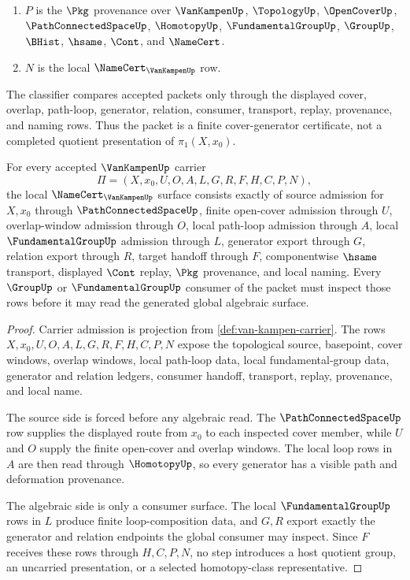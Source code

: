 \begin{definition}
\begin{enumerate}
\item $P$ is the $\Pkg$ provenance over $\VanKampenUp$, $\TopologyUp$, $\OpenCoverUp$, $\PathConnectedSpaceUp$, $\HomotopyUp$, $\FundamentalGroupUp$, $\GroupUp$, $\BHist$, $\hsame$, $\Cont$, and $\NameCert$.
\item $N$ is the local $\NameCert_{\VanKampenUp}$ row.
\end{enumerate}
The classifier compares accepted packets only through the displayed cover, overlap, path-loop, generator, relation, consumer, transport, replay, provenance, and naming rows. Thus the packet is a finite cover-generator certificate, not a completed quotient presentation of $\pi_1(X,x_0)$.
\end{definition}

\begin{theorem}
\label{thm:van-kampen-namecert-obligations}
For every accepted $\VanKampenUp$ carrier
$$
\Pi=(X,x_0,U,O,A,L,G,R,F,H,C,P,N),
$$
the local $\NameCert_{\VanKampenUp}$ surface consists exactly of source admission for $X,x_0$ through $\PathConnectedSpaceUp$, finite open-cover admission through $U$, overlap-window admission through $O$, local path-loop admission through $A$, local $\FundamentalGroupUp$ admission through $L$, generator export through $G$, relation export through $R$, target handoff through $F$, componentwise $\hsame$ transport, displayed $\Cont$ replay, $\Pkg$ provenance, and local naming. Every $\GroupUp$ or $\FundamentalGroupUp$ consumer of the packet must inspect those rows before it may read the generated global algebraic surface.
\end{theorem}
\begin{proof}
Carrier admission is projection from \autoref{def:van-kampen-carrier}. The rows $X,x_0,U,O,A,L,G,R,F,H,C,P,N$ expose the topological source, basepoint, cover windows, overlap windows, local path-loop data, local fundamental-group data, generator and relation ledgers, consumer handoff, transport, replay, provenance, and local name.

The source side is forced before any algebraic read. The $\PathConnectedSpaceUp$ row supplies the displayed route from $x_0$ to each inspected cover member, while $U$ and $O$ supply the finite open-cover and overlap windows. The local loop rows in $A$ are then read through $\HomotopyUp$, so every generator has a visible path and deformation provenance.

The algebraic side is only a consumer surface. The local $\FundamentalGroupUp$ rows in $L$ produce finite loop-composition data, and $G,R$ export exactly the generator and relation endpoints the global consumer may inspect. Since $F$ receives these rows through $H,C,P,N$, no step introduces a host quotient group, an uncarried presentation, or a selected homotopy-class representative.
\end{proof}

